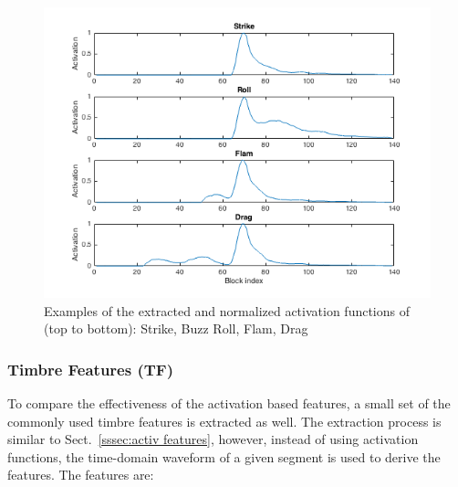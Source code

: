 \documentclass{article}
\begin{document}



\begin{figure}
\centering
\includegraphics[width = 8 cm]{./figures/activ_all.png}
\caption{Examples of the extracted and normalized activation functions of (top to bottom): Strike, Buzz Roll, Flam, Drag}
\label{fig:atvall}
\end{figure}

\subsubsection{Timbre Features (TF)}
\label{sssec:timbre features}
To compare the effectiveness of the activation based features, a small set of the commonly used timbre features is extracted as well. The extraction process is similar to Sect.~\ref{sssec:activ features}, however, instead of using activation functions, the time-domain waveform of a given segment is used to derive the features. The features are: 
\end{document}
